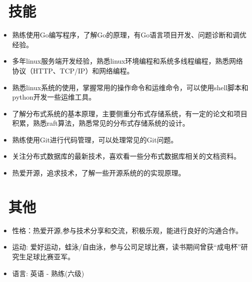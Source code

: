 \documentclass{resume}
\begin{document}
\section{\faCogs\  技能}
\begin{itemize}[parsep=0.5ex]
  \item 熟练使用Go编写程序，了解Go的原理，有Go语言项目开发、问题诊断和调优经验。
  \item 多年linux服务端开发经验，熟悉linux环境编程和系统多线程编程，熟悉网络协议（HTTP、TCP/IP）和网络编程。
  \item 熟悉linux系统的使用，掌握常用的操作命令和运维命令，可以使用shell脚本和python开发一些运维工具。
  \item 了解分布式系统的基本原理，主要侧重分布式存储系统，有一定的论文和项目积累，熟悉raft算法，熟悉常见的分布式存储系统的设计。
  \item 熟练使用Git进行代码管理，可以处理常见的Git问题。
  \item 关注分布式数据库的最新技术，喜欢看一些分布式数据库相关的文档资料。
  \item 热爱开源，追求技术，了解一些开源系统的的实现原理。
\end{itemize}

\section{\faInfo\  其他}
\begin{itemize}[parsep=0.5ex]
  \item 性格：热爱开源,参与技术分享和交流，积极乐观，能进行良好的沟通合作。
  \item 运动: 爱好运动，蛙泳/自由泳，参与公司足球比赛，读书期间曾获“成电杯”研究生足球比赛亚军。
  \item 语言: 英语 - 熟练(六级)
\end{itemize}

%
%
\end{document}
